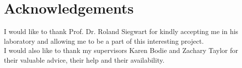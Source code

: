 \chapter*{Acknowledgements}

I would like to thank Prof. Dr. Roland Siegwart for kindly accepting me in his
laboratory and allowing me to be a part of this interesting project.\\
I would also like to thank my supervisors Karen Bodie and Zachary Taylor
for their valuable advice, their help and their availability.\\
